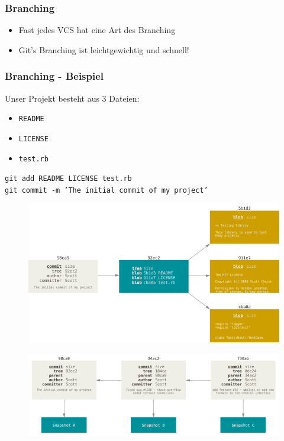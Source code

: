 \documentclass[12pt,utf8]{beamer}
\begin{document}
	\begin{frame}
		\frametitle{Branching}	
		\begin{itemize}
			\item Fast jedes VCS hat eine Art des Branching
			\item Git's Branching ist leichtgewichtig und schnell!
		\end{itemize}
	\end{frame}

	\begin{frame}
		\frametitle{Branching - Beispiel}
		Unser Projekt besteht aus 3 Dateien:
		\begin{itemize}
			\item[] \texttt{README}
			\item[] \texttt{LICENSE}
			\item[] \texttt{test.rb}
		\end{itemize}
	
		\texttt{git add README LICENSE test.rb}\\
		\texttt{git commit -m 'The initial commit of my project'}
	\end{frame}
	
	\begin{frame}
		\begin{figure}
			\includegraphics[scale=0.4]{resources/commit-and-tree.png}
			\caption*{\tiny{\cite{commit-and-tree}}}
		\end{figure}
	\end{frame}

	\begin{frame}
		\begin{figure}
			\includegraphics[scale=0.4]{resources/commits-and-parents.png}
			\caption*{\tiny{\cite{commit-and-tree}}}
		\end{figure}
	\end{frame}
\end{document}
